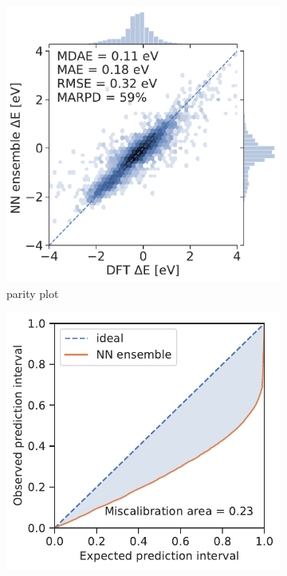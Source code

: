 \documentclass[]{achemso}
\begin{document}
\begin{figure}
    \centering
    \begin{subfigure}[b]{0.32\textwidth}
        \includegraphics[width=\textwidth]{../NN_ensemble/parity.pdf}
        \caption{parity plot}\label{fig:parity_example}
    \end{subfigure}
    \begin{subfigure}[b]{0.32\textwidth}
        \includegraphics[width=\textwidth]{../NN_ensemble/calibration.pdf}

\end{subfigure}
\end{figure}
\end{document}
